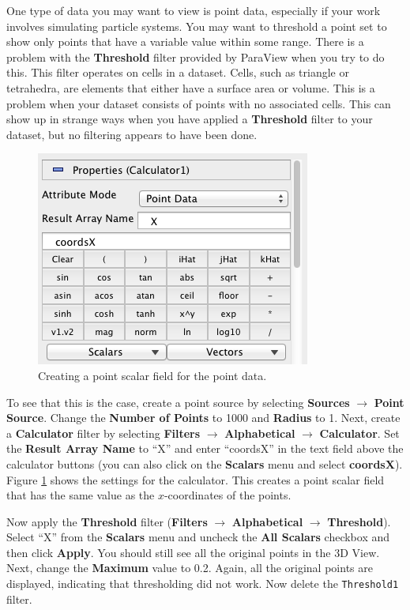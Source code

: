 \documentclass[12pt]{article}
\newcommand{\filter}[1]{\textbf{#1}}
\newcommand{\filterinstance}[1]{\texttt{#1}}
\newcommand{\menu}[1]{\textbf{#1}}
\newcommand{\setting}[1]{\textbf{#1}}
\begin{document}
One type of data you may want to view is point data, especially if your work involves simulating particle systems. You may want to threshold a point set to show only points that have a variable value within some range. There is a problem with the \filter{Threshold} filter provided by ParaView when you try to do this. This filter operates on cells in a dataset. Cells, such as triangle or tetrahedra, are elements that either have a surface area or volume. This is a problem when your dataset consists of points with no associated cells. This can show up in strange ways when you have applied a \filter{Threshold} filter to your dataset, but no filtering appears to have been done.

\begin{figure}[htbp]
   \centering
   \includegraphics[scale=.5]{images/ThresholdPointsFilterCalculator.png} %
   \caption{Creating a point scalar field for the point data.}
   \label{fig:ThresholdPointsFilterCalculator}
\end{figure}

To see that this is the case, create a point source by selecting \menu{Sources} $\rightarrow$ \menu {Point Source}. Change the \setting{Number of Points} to 1000 and \setting{Radius} to 1. Next, create a \filter{Calculator} filter by selecting \menu{Filters} $\rightarrow$ \menu{Alphabetical} $\rightarrow$ \menu{Calculator}. Set the \setting{Result Array Name} to ``X'' and enter ``coordsX'' in the text field above the calculator buttons (you can also click on the \menu{Scalars} menu and select \menu{coordsX}). Figure \ref{fig:ThresholdPointsFilterCalculator} shows the settings for the calculator. This creates a point scalar field that has the same value as the $x$-coordinates of the points.

Now apply the \filter{Threshold} filter (\menu{Filters} $\rightarrow$ \menu{Alphabetical} $\rightarrow$ \menu{Threshold}). Select ``X'' from the \setting{Scalars} menu and uncheck the \setting{All Scalars} checkbox and then click \setting{Apply}. You should still see all the original points in the 3D View. Next, change the \setting{Maximum} value to 0.2. Again, all the original points are displayed, indicating that thresholding did not work. Now delete the \filterinstance{Threshold1} filter.
\end{document}
